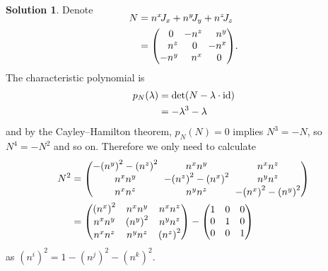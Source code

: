 \documentclass[11pt, a4paper]{report}
\theoremstyle{definition}
\newtheorem{solution}{Solution}[part]
\newenvironment{sol}{\begin{solution}}{\end{solution}\pagebreak[3]}
\newcommand*{\settightmatrix}{\ensuremath\setlength{\arraycolsep}{0.7ex}}
\newenvironment{tightmatrix}
    {\settightmatrix}{}
\newcommand*{\op}[1]{\ensuremath\mathop{}\mathopen{}#1}
\newcommand*{\id}{\op{\mathrm{id}}}
\begin{document}
\begin{sol}
Denote
\begin{align*}
    \SwapAboveDisplaySkip
    N &= n^x \! J_x + n^y \! J_y + n^z \! J_z \\
      &= \begin{tightmatrix}\begin{pmatrix*}[r]
            0 \phantom{^z} & -n^z  & n^y \\
            n^z            & 0 \phantom{^x} & -n^x \\
            -n^y           & n^x            & 0 \phantom{^x}
         \end{pmatrix*}\end{tightmatrix}.
\end{align*}
The characteristic polynomial is
\begin{align*}
    p_N(\lambda) &= \det(N - \lambda \cdot \id) \\
        &= -\lambda^3 - \lambda
\end{align*}
and by the Cayley--Hamilton theorem, $p_N(N) = 0$ implies $N^3 = -N$, so $N^4 = -N^2$ and so on.
Therefore we only need to calculate
\begin{align*}
    N^2 &= \begin{tightmatrix}\begin{pmatrix}
        -{(n^y)}^2 - {(n^z)}^2 & n^x n^y & n^x n^z \\
        n^x n^y & -{(n^z)}^2 - {(n^x)}^2 & n^y n^z \\
        n^x n^z & n^y n^z                & -{(n^x)}^2 - {(n^y)}^2
    \end{pmatrix}\end{tightmatrix} \\
       &= \begin{pmatrix}
        {(n^x)}^2 & n^x n^y   & n^x n^z \\
        n^x n^y   & {(n^y)}^2 & n^y n^z \\
        n^x n^z   & n^y n^z   & {(n^z)}^2
    \end{pmatrix}
    - \begin{pmatrix}
        1 & 0 & 0 \\
        0 & 1 & 0 \\
        0 & 0 & 1
    \end{pmatrix}
\end{align*}
as ${(n^i)}^2 = 1 - {(n^j)}^2 - {(n^k)}^2$.


\end{sol}
\end{document}
